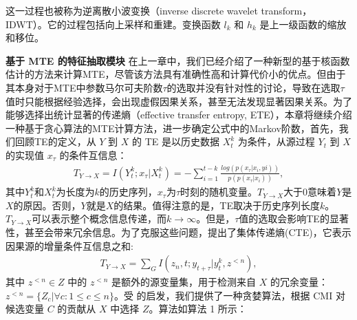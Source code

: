 这一过程也被称为逆离散小波变换（inverse discrete wavelet transform，IDWT）。它的过程包括向上采样和重建。变换函数 $l_{k}$ 和 $h_{k}$ 是上一级函数的缩放和移位。

\textbf{基于 MTE 的特征抽取模块} 在上一章中，我们已经介绍了一种新型的基于核函数估计的方法来计算MTE，尽管该方法具有准确性高和计算代价小的优点。但由于其本身对于MTE中参数马尔可夫阶数$\tau$的选取并没有针对性的讨论，导致在选取$\tau$值时只能根据经验选择，会出现虚假因果关系，甚至无法发现显著因果关系。为了能够选择出统计显著的传递熵（effective transfer entropy, ETE），本章将继续介绍一种基于贪心算法的MTE计算方法，进一步确定公式中的Markov阶数，首先，我们回顾TE的定义，从 $Y$ 到 $X$ 的 TE 是以历史数据 $X_{t}^{k}$ 为条件，从源过程 $Y_{t}$ 到 $X$ 的实现值 $x_{\tau}$ 的条件互信息：
\begin{equation}\label{TE}
\begin{array}{ll}
T_{Y\rightarrow X}=I(Y_{t}^{k};x_{\tau} |X_{t}^{k})=-\sum^{t-k}_{i=1}\frac{log(p(x_{\tau}|x_{i},y{i}))}{p(p(x_{\tau}|x_{i}))},
\end{array}
\end{equation}
其中$Y_{t}^{k}$和$X_{t}^{k}$为长度为$k$的历史序列，$x_{\tau}$为$\tau$时刻的随机变量。$T_{Y\rightarrow X}$大于0意味着$Y$是$X$的原因。否则，$Y$就是$X$的结果。值得注意的是，TE取决于历史序列长度$k$。$T_{Y\rightarrow X}$可以表示整个概念信息传递，而$k\rightarrow \infty$。但是，$\tau$值的选取会影响TE的显著性，甚至会带来冗余信息。为了克服这些问题，\cite{31}提出了集体传递熵(CTE)，它表示因果源的增量条件互信息之和:
\begin{equation}\label{npl1}
\begin{array}{ll}
T_{Y\rightarrow X}=\sum\limits_{G} I(z_{n},t;y_{t+\tau}|y_{t}^{k},z^{<n}),
\end{array}
\end{equation}
其中 $z^{<n} \in Z$ 中的 $z^{<n}$ 是额外的源变量集，用于检测来自 $X$ 的冗余变量：${z^{<n}}=\{Z_{c}|\forall c: 1\leq c \leq n\}$。受 \cite{32} 的启发，我们提供了一种贪婪算法，根据 CMI 对候选变量 $C$ 的贡献从 $X$ 中选择 $Z$。算法如算法 1 所示：

